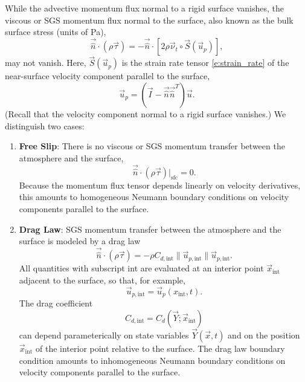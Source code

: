 \documentclass{report}
\begin{document}
While the advective momentum flux normal to a rigid surface vanishes, the viscous or SGS momentum flux normal to the surface, also known as the bulk surface stress (units of Pa), 
\[
\vec{\hat n} \cdot (\rho \vec{\tau}) = - \vec{\hat n} \cdot \left[2\rho \vec{\nu}_t \circ \vec{S}(\vec{u}_p)\right],
\]
may not vanish. Here, $\vec{S}(\vec{u}_p)$ is the strain rate tensor \eqref{e:strain_rate} of the near-surface velocity component parallel to the surface,
 \[
    \vec{u}_p = (\vec{I} - \vec{\hat n} \vec{\hat n}^T) \vec{u}.
\]
(Recall that the velocity component normal to a rigid surface vanishes.) We distinguish two cases:
\begin{enumerate}
    \item \textbf{Free Slip}: There is no viscous or SGS momentum transfer between the atmosphere and the surface,
    \[
    \vec{\hat n} \cdot (\rho \vec{\tau})\bigl|_\mathrm{sfc} = 0.
    \]
    Because the momentum flux tensor depends linearly on velocity derivatives, this amounts to homogeneous Neumann boundary conditions on velocity components parallel to the surface.
    \item \textbf{Drag Law}: SGS momentum transfer between the atmosphere and the surface is modeled by a drag law 
    \begin{equation}\label{e:drag_law}
    \vec{\hat n} \cdot (\rho \vec{\tau})  = - \rho C_{d, \mathrm{int}} \| \vec{u}_{p, \mathrm{int}} \| \vec{u}_{p, \mathrm{int}}.
    \end{equation}
    All quantities with subscript int are evaluated at an interior point $\vec{x}_\mathrm{int}$ adjacent to the surface, so that, for example,
    \[
   \vec{u}_{p, \mathrm{int}} = \vec{u}_p (x_\mathrm{int}, t).
    \]
    The drag coefficient
    \[
    C_{d, \mathrm{int}} = C_d(\vec{Y}; \vec{x}_\mathrm{int})
    \]
    can depend parameterically on state variables $\vec{Y}(\vec{x}, t)$ and on the position $\vec{x}_\mathrm{int}$ of the interior point relative to the surface. The drag law boundary condition amounts to inhomogeneous Neumann boundary conditions on velocity components parallel to the surface.
\end{enumerate}
\end{document}
